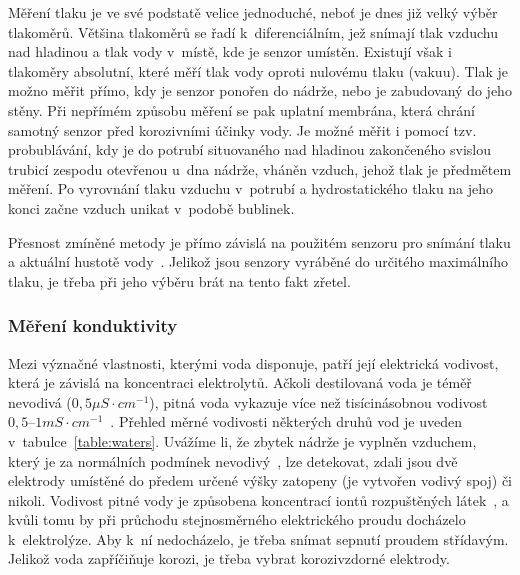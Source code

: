             Měření tlaku je ve své podstatě velice jednoduché, neboť je dnes již velký výběr tlakoměrů. Většina tlakoměrů se řadí k~diferenciálním, jež snímají tlak vzduchu nad hladinou a tlak vody v~místě, kde je senzor umístěn. Existují však i tlakoměry absolutní, které měří tlak vody oproti nulovému tlaku (vakuu). Tlak je možno měřit přímo, kdy je senzor ponořen do nádrže, nebo je zabudovaný do jeho stěny. Při nepřímém způsobu měření se pak uplatní membrána, která chrání samotný senzor před korozivními účinky vody. Je možné měřit i pomocí tzv. probublávání, kdy je do potrubí situovaného nad hladinou zakončeného svislou trubicí zespodu otevřenou u~dna nádrže, vháněn vzduch, jehož tlak je předmětem měření. Po vyrovnání tlaku vzduchu v~potrubí a hydrostatického tlaku na jeho konci začne vzduch unikat v~podobě bublinek.
            
            Přesnost zmíněné metody je přímo závislá na použitém senzoru pro snímání tlaku a aktuální hustotě vody~\cite{dado}. Jelikož jsou senzory vyráběné do určitého maximálního tlaku, je třeba při jeho výběru brát na tento fakt zřetel. 

        \subsubsection{Měření konduktivity}
            Mezi význačné vlastnosti, kterými voda disponuje, patří její elektrická vodivost, která je závislá na koncentraci elektrolytů. 
            Ačkoli destilovaná voda je téměř nevodivá ($0,5\unit{\mu S\cdot cm^{-1}}$), pitná voda vykazuje více než tisícinásobnou vodivost $0,5$--$1\unit{mS\cdot cm^{-1}}$~\cite{conductivity}. Přehled měrné vodivosti některých druhů vod je uveden v~tabulce~\ref{table:waters}. Uvážíme li, že zbytek nádrže je vyplněn vzduchem, který je za normálních podmínek nevodivý~\cite{gas_conductivity}, lze detekovat, zdali jsou dvě elektrody umístěné do předem určené výšky zatopeny (je vytvořen vodivý spoj) či nikoli. Vodivost pitné vody je způsobena koncentrací iontů rozpuštěných látek~\cite{water_conductivity}, a kvůli tomu by při průchodu stejnosměrného elektrického proudu docházelo k~elektrolýze. Aby k~ní nedocházelo, je třeba snímat sepnutí proudem střídavým. Jelikož voda zapříčiňuje korozi, je třeba vybrat korozivzdorné elektrody.

